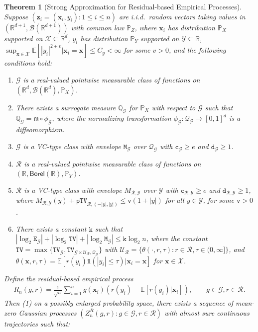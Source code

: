 \documentclass[10pt]{article}
\newtheorem{thm}{Theorem}
\renewcommand{\P}{\mathbb{P}}
\newcommand{\E}{\mathbb{E}}
\newcommand{\Indicator}{\mathds{1}}
\newcommand{\reals}{\mathbb{R}}
\newcommand{\bx}{\mathbf{x}}
\newcommand{\bz}{\mathbf{z}}
\newcommand{\B}{\mathcal{B}}
\newcommand{\G}{\mathcal{G}}
\newcommand{\Q}{\mathcal{Q}}
\newcommand{\R}{\mathcal{R}}
\newcommand{\X}{\mathcal{X}}
\newcommand{\Y}{\mathcal{Y}}
\newcommand{\bbQ}{\mathbb{Q}}
\newcommand{\ttc}{\mathtt{c}}
\newcommand{\ttM}{\mathtt{M}}
\newcommand{\ttTV}{\mathtt{TV}}
\begin{document}
\begin{thm}[Strong Approximation for Residual-based Empirical Processes]\label{sa-thm: Residual Empirical Process Strong Approximation}
    Suppose $(\bz_i=(\bx_i, y_i): 1 \leq i \leq n)$ are i.i.d.\ random vectors taking values in $(\reals^{d+1}, \B(\reals^{d+1}))$ with common law $\P_Z$, where $\bx_i$ has distribution $\P_X$ supported on $\X\subseteq\reals^d$, $y_i$ has distribution $\P_Y$ supported on $\Y\subseteq\reals$, $\sup_{\bx \in \X}\E[|y_i|^{2 + v}|\bx_i = \bx] \leq C_y<\infty$ for some $v > 0$, and the following conditions hold:

    \begin{enumerate}[label=\emph{(\roman*)}]
        \item $\G$ is a real-valued pointwise measurable class of functions on $(\reals^d, \B(\reals^d), \P_X)$.
        \item There exists a surrogate measure $\bbQ_\G$ for $\P_X$ with respect to $\G$ such that $\bbQ_\G = \mathfrak{m} \circ \phi_\G$, where the \textit{normalizing transformation} $\phi_{\G}: \Q_\G \to [0,1]^d$ is a diffeomorphism.
        \item $\G$ is a VC-type class with envelope $\ttM_{\G}$ over $\Q_\G$ with $\ttc_{\G} \geq e$ and $\mathtt{d}_{\G} \geq 1$.
        \item $\R$ is a real-valued pointwise measurable class of functions on $(\reals, \mathsf{Borel}(\reals),\P_Y)$.
        \item $\R$ is a VC-type class with envelope $M_{\R,\Y}$ over $\Y$ with $\ttc_{\R,\Y}\geq e$ and $\mathtt{d}_{\R,\Y}\geq 1$, where $M_{\R,\Y}(y) + \mathtt{pTV}_{\R,(-|y|,|y|)} \leq \mathtt{v} (1 + |y|)$ for all $y \in \Y$, for some $\mathtt{v}>0$.
        \item There exists a constant $\mathtt{k}$ such that $|\log_2 \mathtt{E}_{\G}| + |\log_2 \ttTV| + |\log_2 \ttM_{\G}| \leq \mathtt{k} \log_2 n$, where the constant $\ttTV = \max \{\ttTV_{\G}, \ttTV_{\G \times \mathscr{U}_{\R},\Q_\G}\}$ with $\mathscr{U}_{\R} = \{\theta(\cdot,r, \tau) : r \in \R, \tau \in (0,\infty]\}$, and $\theta(\bx,r,\tau) = \E[r(y_i) \Indicator(|y_i| \leq \tau)|\bx_i = \bx]$ for $\bx \in \X$.
    \end{enumerate}
    Define the residual-based empirical process
    \begin{align*}
        R_n(g,r) = \frac{1}{\sqrt{n}} \sum_{i = 1}^n g(\bx_i)(r(y_i) - \E[r(y_i)|\bx_i]), \qquad g \in \G, r \in \R.
    \end{align*}
    Then (1) on a possibly enlarged probability space, there exists a sequence of mean-zero Gaussian processes $(Z_n^R(g,r): g\in\G, r \in \R)$ with almost sure continuous trajectories such that:

\end{thm}
\end{document}
